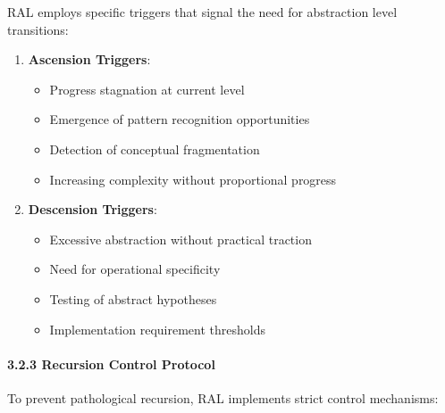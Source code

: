 \documentclass[
]{article}
\providecommand{\tightlist}{%
  \setlength{\itemsep}{0pt}\setlength{\parskip}{0pt}}
\begin{document}
RAL employs specific triggers that signal the need for abstraction level
transitions:

\begin{enumerate}
\def\labelenumi{\arabic{enumi}.}
\tightlist
\item
  \textbf{Ascension Triggers}:

  \begin{itemize}
  \tightlist
  \item
    Progress stagnation at current level
  \item
    Emergence of pattern recognition opportunities
  \item
    Detection of conceptual fragmentation
  \item
    Increasing complexity without proportional progress
  \end{itemize}
\item
  \textbf{Descension Triggers}:

  \begin{itemize}
  \tightlist
  \item
    Excessive abstraction without practical traction
  \item
    Need for operational specificity
  \item
    Testing of abstract hypotheses
  \item
    Implementation requirement thresholds
  \end{itemize}
\end{enumerate}

\paragraph{3.2.3 Recursion Control
Protocol}\label{recursion-control-protocol}

To prevent pathological recursion, RAL implements strict control
mechanisms:
\end{document}
